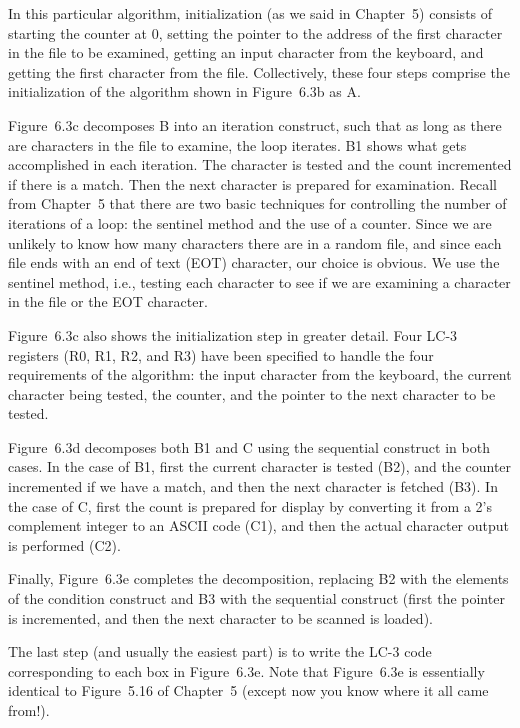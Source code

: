 \documentclass{patt}
\begin{document}
In this particular algorithm, initialization (as we said in Chapter~5)
consists of starting the counter at 0, setting the pointer to the address
of the first character in the file to be examined, getting an input character
from the keyboard, and getting the first character from the file.
Collectively, these four steps comprise the initialization of the algorithm
shown in Figure~6.3b as A.

Figure~6.3c decomposes B into an iteration construct, such that as
long as there are characters in the file to examine, the loop
iterates. B1 shows what gets accomplished in each iteration. The
character is tested and the count incremented if there is a match.
Then the next character is prepared for examination. Recall from
Chapter~5 that there are two basic techniques for controlling the
number of iterations of a loop: the sentinel method and the use of a counter.  
Since we are unlikely to know how many characters there are in a random
file, and since each file ends with an end of text (EOT) character, our choice
is obvious.  We use the sentinel method, i.e., testing each character to
see if we are examining a character in the file or the EOT character.

Figure~6.3c also shows the initialization step in greater detail. Four
LC-3 registers
(R0, R1, R2, and R3) have been specified to handle the four requirements
of the algorithm: the input character from the keyboard, the current
character being tested, the counter, and the pointer to the next
character to be tested.

Figure~6.3d decomposes both B1 and C using the sequential construct in
both cases.
In the case of B1, first the current character is tested (B2), and the
counter incremented if we have a match, and then the next character is
fetched (B3).  In the case of C, first the count is prepared for
display by converting it from a 2's complement integer to an ASCII code (C1),
and then the actual character output is performed (C2).

Finally, Figure~6.3e completes the decomposition, replacing B2
with the elements of the condition construct and B3 with the
sequential construct (first the pointer is incremented, and
then the next character to be scanned is loaded).

The last step (and usually the easiest part) is to write the LC-3 code
corresponding to each box in Figure~6.3e.  Note that Figure~6.3e is
essentially identical to Figure~5.16 of Chapter~5 (except now you know
where it all came from!).
\end{document}

